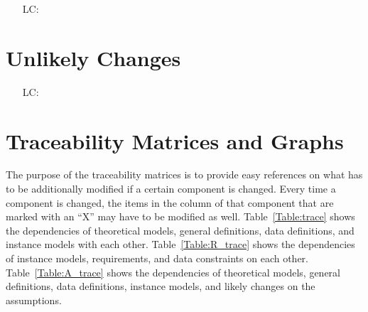\documentclass[12pt]{article}
\newcounter{lcnum} %
\begin{document}
\noindent \begin{itemize}

  \item[LC\refstepcounter{lcnum}\thelcnum\label{LC_meaningfulLabel}:] 

\end{itemize}

\section{Unlikely Changes}

\noindent \begin{itemize}

  \item[LC\refstepcounter{lcnum}\thelcnum\label{LC_meaningfulLabel}:] 

\end{itemize}

\section{Traceability Matrices and Graphs}

The purpose of the traceability matrices is to provide easy references on what
has to be additionally modified if a certain component is changed.  Every time a
component is changed, the items in the column of that component that are marked
with an ``X'' may have to be modified as well.  Table~\ref{Table:trace} shows the
dependencies of theoretical models, general definitions, data definitions, and
instance models with each other. Table~\ref{Table:R_trace} shows the
dependencies of instance models, requirements, and data constraints on each
other. Table~\ref{Table:A_trace} shows the dependencies of theoretical models,
general definitions, data definitions, instance models, and likely changes on
the assumptions.



\end{document}
